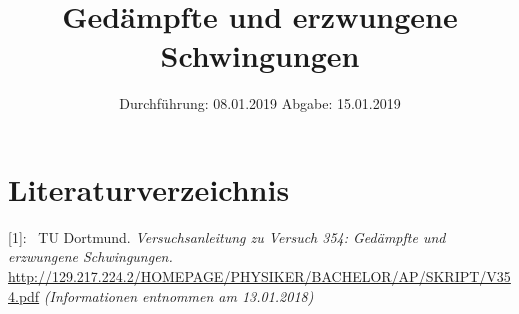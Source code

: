 

\subject{Nr.354}
\title{Gedämpfte und erzwungene Schwingungen}
\date{
  Durchführung: 08.01.2019
  \hspace{3em}
  Abgabe: 15.01.2019
}



\maketitle
\thispagestyle{empty}
\tableofcontents
\newpage






\section{Literaturverzeichnis}

[1]: \ TU Dortmund. \textit{Versuchsanleitung zu Versuch 354:
Gedämpfte und erzwungene Schwingungen.}\newline
\url{http://129.217.224.2/HOMEPAGE/PHYSIKER/BACHELOR/AP/SKRIPT/V354.pdf}
\textit{(Informationen entnommen am 13.01.2018)}\newline

\printbibliography{}


